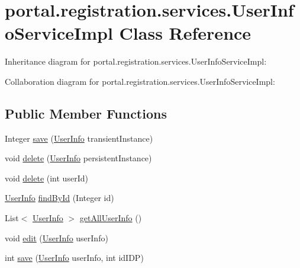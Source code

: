 \hypertarget{classportal_1_1registration_1_1services_1_1UserInfoServiceImpl}{
\section{portal.registration.services.UserInfoServiceImpl Class Reference}
\label{classportal_1_1registration_1_1services_1_1UserInfoServiceImpl}
}


Inheritance diagram for portal.registration.services.UserInfoServiceImpl:


Collaboration diagram for portal.registration.services.UserInfoServiceImpl:
\subsection*{Public Member Functions}
\begin{DoxyCompactItemize}
\item 
Integer \hyperlink{classportal_1_1registration_1_1services_1_1UserInfoServiceImpl_a1c859300be6b65159f13c115828c8255}{save} (\hyperlink{classportal_1_1registration_1_1domain_1_1UserInfo}{UserInfo} transientInstance)
\item 
void \hyperlink{classportal_1_1registration_1_1services_1_1UserInfoServiceImpl_a12f7a4c7e73e0f36ed24ce19c1f9473c}{delete} (\hyperlink{classportal_1_1registration_1_1domain_1_1UserInfo}{UserInfo} persistentInstance)
\item 
void \hyperlink{classportal_1_1registration_1_1services_1_1UserInfoServiceImpl_a59c0dc5d8e3cd6773677a97f75748cc4}{delete} (int userId)
\item 
\hyperlink{classportal_1_1registration_1_1domain_1_1UserInfo}{UserInfo} \hyperlink{classportal_1_1registration_1_1services_1_1UserInfoServiceImpl_aea9a7b9166bf093b0013919c28bb52cc}{findById} (Integer id)
\item 
List$<$ \hyperlink{classportal_1_1registration_1_1domain_1_1UserInfo}{UserInfo} $>$ \hyperlink{classportal_1_1registration_1_1services_1_1UserInfoServiceImpl_a481f54f59bb67c11e1b9c4497bfa426b}{getAllUserInfo} ()
\item 
void \hyperlink{classportal_1_1registration_1_1services_1_1UserInfoServiceImpl_ad14b5bdfe6a57e8a9b412fb3084f51d9}{edit} (\hyperlink{classportal_1_1registration_1_1domain_1_1UserInfo}{UserInfo} userInfo)
\item 
int \hyperlink{classportal_1_1registration_1_1services_1_1UserInfoServiceImpl_ad15a856a87f217600bbd708e576d80ba}{save} (\hyperlink{classportal_1_1registration_1_1domain_1_1UserInfo}{UserInfo} userInfo, int idIDP)
\end{DoxyCompactItemize}
